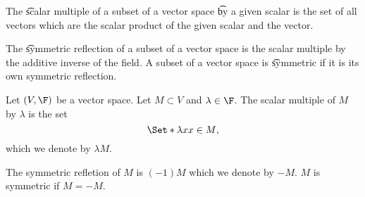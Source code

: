 


The \t{scalar multiple} of a subset of a vector space \t{by} a given scalar is the set of all vectors which are the scalar product of the given scalar and the vector.

The \t{symmetric reflection} of a subset of a vector space is the scalar multiple by the additive inverse of the field.
A subset of a vector space is \t{symmetric} if it is its own symmetric reflection.


Let $(V, \F)$ be a vector space.
Let $M \subset V$ and $\lambda \in \F$.
The scalar multiple of $M$ by $\lambda$ is the set
$$
  \Set*{\lambda x}{x \in M},
$$
which we denote by $\lambda M$.

The symmetric refletion of $M$ is  $(-1)M$ which we denote by $-M$.
$M$ is symmetric if $M = -M$.
